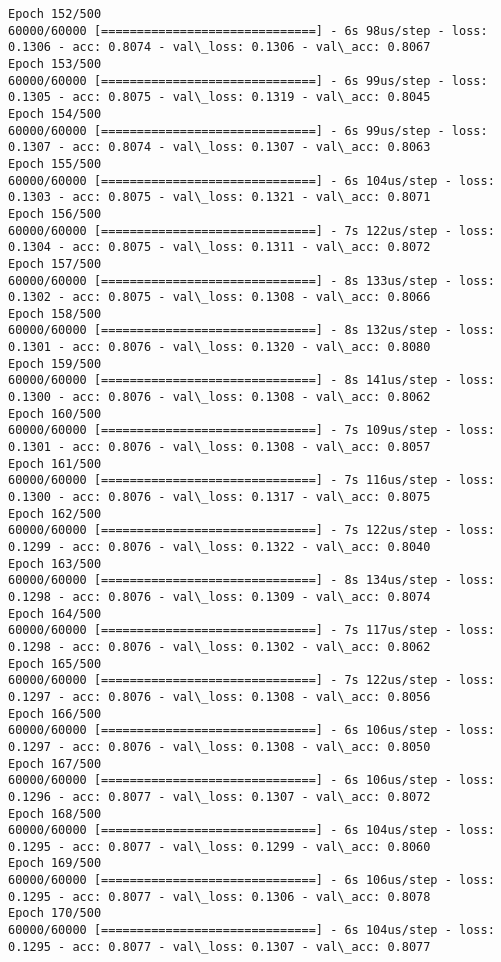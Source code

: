 \documentclass[11pt]{article}
\begin{document}
\begin{Verbatim}[commandchars=\\\{\}]
Epoch 152/500
60000/60000 [==============================] - 6s 98us/step - loss: 0.1306 - acc: 0.8074 - val\_loss: 0.1306 - val\_acc: 0.8067
Epoch 153/500
60000/60000 [==============================] - 6s 99us/step - loss: 0.1305 - acc: 0.8075 - val\_loss: 0.1319 - val\_acc: 0.8045
Epoch 154/500
60000/60000 [==============================] - 6s 99us/step - loss: 0.1307 - acc: 0.8074 - val\_loss: 0.1307 - val\_acc: 0.8063
Epoch 155/500
60000/60000 [==============================] - 6s 104us/step - loss: 0.1303 - acc: 0.8075 - val\_loss: 0.1321 - val\_acc: 0.8071
Epoch 156/500
60000/60000 [==============================] - 7s 122us/step - loss: 0.1304 - acc: 0.8075 - val\_loss: 0.1311 - val\_acc: 0.8072
Epoch 157/500
60000/60000 [==============================] - 8s 133us/step - loss: 0.1302 - acc: 0.8075 - val\_loss: 0.1308 - val\_acc: 0.8066
Epoch 158/500
60000/60000 [==============================] - 8s 132us/step - loss: 0.1301 - acc: 0.8076 - val\_loss: 0.1320 - val\_acc: 0.8080
Epoch 159/500
60000/60000 [==============================] - 8s 141us/step - loss: 0.1300 - acc: 0.8076 - val\_loss: 0.1308 - val\_acc: 0.8062
Epoch 160/500
60000/60000 [==============================] - 7s 109us/step - loss: 0.1301 - acc: 0.8076 - val\_loss: 0.1308 - val\_acc: 0.8057
Epoch 161/500
60000/60000 [==============================] - 7s 116us/step - loss: 0.1300 - acc: 0.8076 - val\_loss: 0.1317 - val\_acc: 0.8075
Epoch 162/500
60000/60000 [==============================] - 7s 122us/step - loss: 0.1299 - acc: 0.8076 - val\_loss: 0.1322 - val\_acc: 0.8040
Epoch 163/500
60000/60000 [==============================] - 8s 134us/step - loss: 0.1298 - acc: 0.8076 - val\_loss: 0.1309 - val\_acc: 0.8074
Epoch 164/500
60000/60000 [==============================] - 7s 117us/step - loss: 0.1298 - acc: 0.8076 - val\_loss: 0.1302 - val\_acc: 0.8062
Epoch 165/500
60000/60000 [==============================] - 7s 122us/step - loss: 0.1297 - acc: 0.8076 - val\_loss: 0.1308 - val\_acc: 0.8056
Epoch 166/500
60000/60000 [==============================] - 6s 106us/step - loss: 0.1297 - acc: 0.8076 - val\_loss: 0.1308 - val\_acc: 0.8050
Epoch 167/500
60000/60000 [==============================] - 6s 106us/step - loss: 0.1296 - acc: 0.8077 - val\_loss: 0.1307 - val\_acc: 0.8072
Epoch 168/500
60000/60000 [==============================] - 6s 104us/step - loss: 0.1295 - acc: 0.8077 - val\_loss: 0.1299 - val\_acc: 0.8060
Epoch 169/500
60000/60000 [==============================] - 6s 106us/step - loss: 0.1295 - acc: 0.8077 - val\_loss: 0.1306 - val\_acc: 0.8078
Epoch 170/500
60000/60000 [==============================] - 6s 104us/step - loss: 0.1295 - acc: 0.8077 - val\_loss: 0.1307 - val\_acc: 0.8077

\end{Verbatim}
\end{document}
